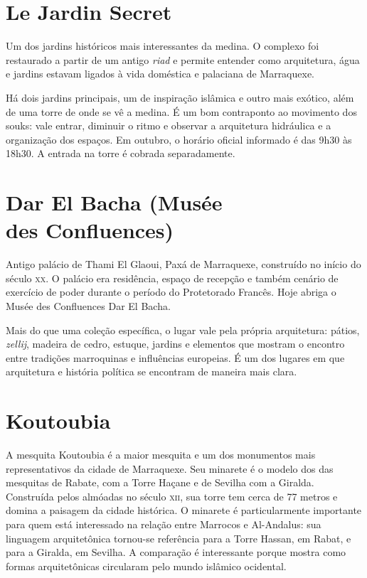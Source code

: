 \chapter{Le Jardin Secret}

Um dos jardins históricos mais interessantes da medina. O complexo foi restaurado a partir de um antigo \textit{riad} e permite entender como arquitetura, água e jardins estavam ligados à vida doméstica e palaciana de Marraquexe.

Há dois jardins principais, um de inspiração islâmica e outro mais exótico, além de uma torre de onde se vê a medina. É um bom contraponto ao movimento dos souks: vale entrar, diminuir o ritmo e observar a arquitetura hidráulica e a organização dos espaços. Em outubro, o horário oficial informado é das 9h30 às 18h30. A entrada na torre é cobrada separadamente.

\chapter*{Dar El Bacha (Musée\\ des Confluences)}

Antigo palácio de Thami El Glaoui, Paxá de Marraquexe, construído no início do século \textsc{xx}. O palácio era residência, espaço de recepção e também cenário de exercício de poder durante o período do Protetorado Francês. Hoje abriga o Musée des Confluences Dar El Bacha. 

Mais do que uma coleção específica, o lugar vale pela própria arquitetura: pátios, \textit{zellij}, madeira de cedro, estuque, jardins e elementos que mostram o encontro entre tradições marroquinas e influências europeias. É um dos lugares em que arquitetura e história política se encontram de maneira mais clara.

\chapter{Koutoubia}

A mesquita Koutoubia é a maior mesquita e um dos monumentos mais representativos da cidade de Marraquexe. Seu minarete é o modelo dos das mesquitas de Rabate, com a Torre Haçane e de Sevilha com a Giralda. Construída pelos almóadas no século \textsc{xii}, sua torre tem cerca de 77 metros e domina a paisagem da cidade histórica. O minarete é particularmente importante para quem está interessado na relação entre Marrocos e Al-Andalus: sua linguagem arquitetônica tornou-se referência para a Torre Hassan, em Rabat, e para a Giralda, em Sevilha. A comparação é interessante porque mostra como formas arquitetônicas circularam pelo mundo islâmico ocidental.

